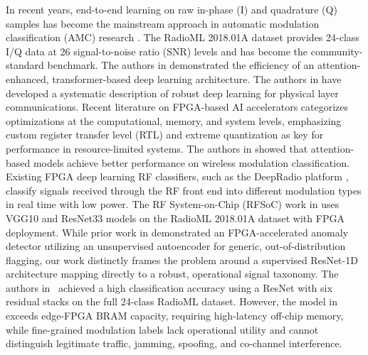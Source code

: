 \documentclass[conference]{IEEEtran}
\begin{document}
In recent years, end-to-end learning on raw in-phase (I) and quadrature (Q) samples has become the mainstream approach in automatic modulation classification (AMC) research \cite{b1, b2}. %
The RadioML 2018.01A dataset \cite{b3} provides 24-class I/Q data at 26 signal-to-noise ratio (SNR) levels and has become the community-standard benchmark. The authors in \cite{b4} demonstrated the efficiency of an attention-enhanced, transformer-based deep learning architecture. The authors in \cite{b5} have developed a systematic description of robust deep learning for physical layer communications.
Recent literature on FPGA-based AI accelerators \cite{b6} categorizes optimizations at the computational, memory, and system levels, emphasizing custom register transfer level (RTL) and extreme quantization as key for performance in resource-limited systems. The authors in \cite{b7} showed that attention-based models achieve better performance on wireless modulation classification.
Existing FPGA deep learning RF classifiers, such as the DeepRadio platform \cite{b8}, classify signals received through the RF front end into different modulation types in real time with low power. The RF System-on-Chip (RFSoC) work in \cite{b9} uses VGG10 and ResNet33 models on the RadioML 2018.01A dataset with FPGA deployment. While prior work in \cite{b10} demonstrated an FPGA-accelerated anomaly detector utilizing an unsupervised autoencoder for generic, out-of-distribution flagging, our work distinctly frames the problem around a supervised ResNet-1D architecture mapping directly to a robust, operational signal taxonomy. The authors in~\cite{b11} achieved a high classification accuracy using a ResNet with six residual stacks on the full 24-class RadioML dataset. However, the model in~\cite{b11} exceeds edge-FPGA BRAM capacity, requiring high-latency off-chip memory, while fine-grained modulation labels lack operational utility and cannot distinguish legitimate traffic, jamming, spoofing, and co-channel interference.
\end{document}
